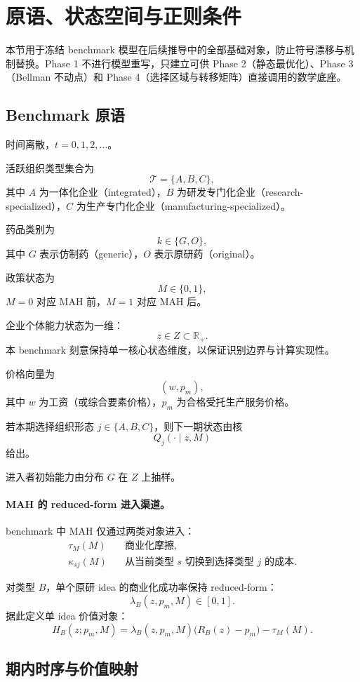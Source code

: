 \section{原语、状态空间与正则条件}

本节用于冻结 benchmark 模型在后续推导中的全部基础对象，防止符号漂移与机制替换。Phase 1 不进行模型重写，只建立可供 Phase 2（静态最优化）、Phase 3（Bellman 不动点）和 Phase 4（选择区域与转移矩阵）直接调用的数学底座。

\subsection{Benchmark 原语}

时间离散，$t=0,1,2,\dots$。

活跃组织类型集合为
\[
\mathcal T=\{A,B,C\},
\]
其中 $A$ 为一体化企业（integrated），$B$ 为研发专门化企业（research-specialized），$C$ 为生产专门化企业（manufacturing-specialized）。

药品类别为
\[
k\in\{G,O\},
\]
其中 $G$ 表示仿制药（generic），$O$ 表示原研药（original）。

政策状态为
\[
M\in\{0,1\},
\]
$M=0$ 对应 MAH 前，$M=1$ 对应 MAH 后。

企业个体能力状态为一维：
\[
z\in Z\subset\mathbb R_+.
\]
本 benchmark 刻意保持单一核心状态维度，以保证识别边界与计算实现性。

价格向量为
\[
(w,p_m),
\]
其中 $w$ 为工资（或综合要素价格），$p_m$ 为合格受托生产服务价格。

若本期选择组织形态 $j\in\{A,B,C\}$，则下一期状态由核
\[
Q_j(\cdot\mid z,M)
\]
给出。

进入者初始能力由分布 $G$ 在 $Z$ 上抽样。

\paragraph{MAH 的 reduced-form 进入渠道。}
benchmark 中 MAH 仅通过两类对象进入：
\begin{align}
\tau_M(M) &\quad \text{商业化摩擦},\\
\kappa_{sj}(M) &\quad \text{从当前类型 } s \text{ 切换到选择类型 } j \text{ 的成本}.
\end{align}

对类型 $B$，单个原研 idea 的商业化成功率保持 reduced-form：
\[
\lambda_B(z,p_m,M)\in[0,1].
\]
据此定义单 idea 价值对象：
\[
H_B(z;p_m,M)=\lambda_B(z,p_m,M)\bigl(R_B(z)-p_m\bigr)-\tau_M(M).
\]

\subsection{期内时序与价值映射}

